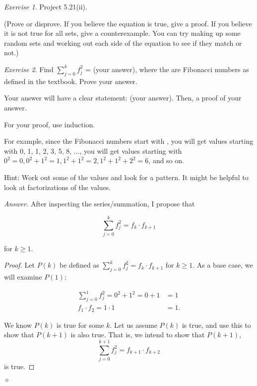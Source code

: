 \documentclass[12pt,oneside]{amsart}
\theoremstyle{remark}
\newtheorem{exer}{Exercise}
\newenvironment{answer}{\bigskip\noindent\emph{Answer.}}{\hfill$\diamond$\newline}
\begin{document}
%
%
%
%
\newpage
\begin{exer}
Project 5.21(ii).

(Prove or disprove. If you believe the equation is true, give a proof. If you believe it is not true for all sets, give a counterexample. You can try making up some random sets and working out each side of the equation to see if they match or not.)
\end{exer}

%
%
%
%
\newpage
\begin{exer}
Find $\sum_{j = 0}^k f^2_j$ = (your answer), where the are Fibonacci numbers as defined in the textbook. Prove your answer.

Your answer will have a clear statement: (your answer). Then, a proof of your answer.

For your proof, use induction.

For example, since the Fibonacci numbers start with , you will get values starting with 0, 1, 1, 2, 3, 5, 8, ..., you will get values starting with $0^2 = 0, 0^2 + 1^2 = 1, 1^2 + 1^2 = 2, 1^2 + 1^2 + 2^2 = 6$, and so on.

Hint: Work out some of the values and look for a pattern. It might be helpful to look at factorizations of the values.
\end{exer}

\begin{answer}
After inspecting the series/summation, I propose that

$$
\sum_{j = 0}^{k} f^2_j = f_k \cdot f_{k + 1}
$$

for $k \geq 1$.

\begin{proof}
Let $P(k)$ be defined as $\sum_{j = 0}^{k} f^2_j = f_k \cdot f_{k + 1}$ for $k \geq 1$. As a base case, we will examine $P(1)$:

\begin{align*}
\sum_{j = 0}^1 f^2_j = 0^2 + 1^2 = 0 + 1 &= 1 \\
f_1 \cdot f_{2} = 1 \cdot 1 &= 1.
\end{align*}

We know $P(k)$ is true for some $k$. Let us assume $P(k)$ is true, and use this to show that $P(k + 1)$ is also true. That is, we intend to show that $P(k + 1)$,
$$
\sum_{j = 0}^{k + 1} f^2_j = f_{k + 1} \cdot f_{k + 2}
$$ is true.
\end{proof}

\end{answer}
\end{document}
